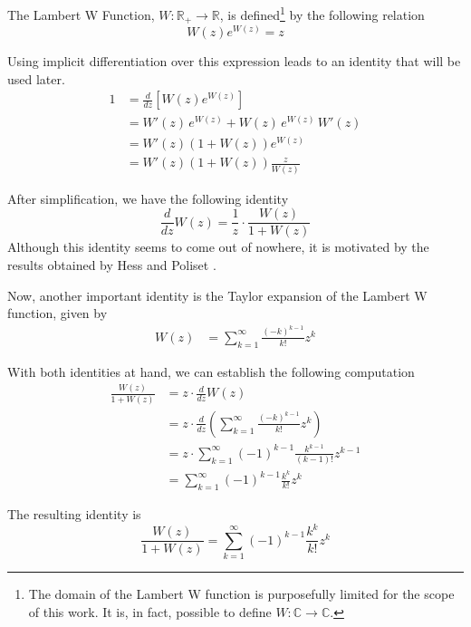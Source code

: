 \documentclass{article}
\newcommand{\R}{\mathbb{R}}
\newcommand{\ppar}[1]{\left( #1 \right)}
\newcommand{\spar}[1]{\left[ #1 \right]}
\begin{document}
The Lambert W Function, $W: \R_+\rightarrow \R$, is defined\footnote{The domain of the Lambert W function is purposefully limited for the scope of this work. It is, in fact, possible to define $W: \mathbb{C}\rightarrow \mathbb{C}$.} by the following relation
\begin{equation}
    W(z) e^{W(z)} = z
\end{equation}

Using implicit differentiation over this expression leads to an identity that will be used later.
\begin{align*}
    1 &=
    \frac{d}{d z} \spar{W(z) e^{W(z)}}
    \\ &=
    W'(z)\, e^{W(z)} + W(z)\, e^{W(z)}\, W'(z)
    \\ &=
    W'(z) \ppar{1+W\ppar{z}} e^{W(z)}
    \\ &=
    W'(z) \ppar{1+W\ppar{z}} \frac{z}{W(z)}
\end{align*}

After simplification, we have the following identity
\begin{equation}
    \frac{d}{dz} W(z) 
    =
    \frac{1}{z} \cdot \frac{W(z)}{1+W(z)}
\end{equation}
Although this identity seems to come out of nowhere, it is motivated by the results obtained by Hess and Poliset \cite{hess2023}.

Now, another important identity is the Taylor expansion of the Lambert W function, given by
\begin{align}
    W(z) 
    &=
    \sum_{k=1}^\infty 
    \frac{(-k)^{k-1}}{k!} z^k
\end{align}

With both identities at hand, we can establish the following computation
\begin{align*}
    \frac{W(z)}{1+W(z)}
    &=
    z \cdot \frac{d}{dz} W(z)
    \\
    &=
    z \cdot \frac{d}{dz} \ppar{\sum_{k=1}^\infty 
    \frac{(-k)^{k-1}}{k!} z^k}
    \\
    &=
    z \cdot {\sum_{k=1}^\infty 
    \ppar{-1}^{k-1}
    \frac{k^{k-1}}{\ppar{k-1}!} z^{k-1}}
    \\
    &=
    {\sum_{k=1}^\infty 
    \ppar{-1}^{k-1}
    \frac{k^{k}}{{k}!} z^{k}}
\end{align*}

The resulting identity is
\begin{equation}
    \frac{W(z)}{1+W(z)}
    =
    {\sum_{k=1}^\infty 
    \ppar{-1}^{k-1}
    \frac{k^{k}}{{k}!} z^{k}}
\end{equation}
\end{document}
